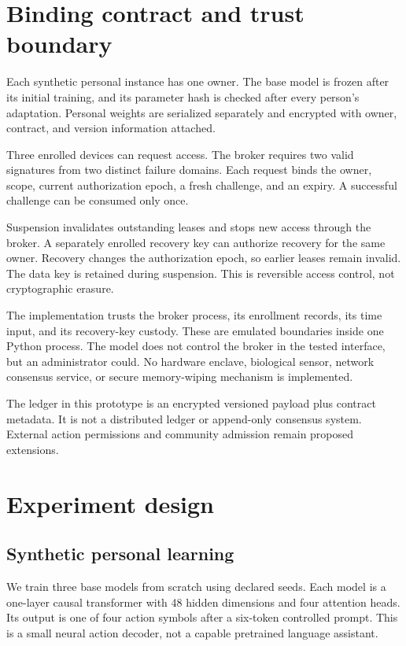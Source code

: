 \documentclass[11pt]{article}
\begin{document}
\section{Binding contract and trust boundary}
Each synthetic personal instance has one owner.
The base model is frozen after its initial training, and its parameter hash is checked after every person's adaptation.
Personal weights are serialized separately and encrypted with owner, contract, and version information attached.

Three enrolled devices can request access.
The broker requires two valid signatures from two distinct failure domains.
Each request binds the owner, scope, current authorization epoch, a fresh challenge, and an expiry.
A successful challenge can be consumed only once.

Suspension invalidates outstanding leases and stops new access through the broker.
A separately enrolled recovery key can authorize recovery for the same owner.
Recovery changes the authorization epoch, so earlier leases remain invalid.
The data key is retained during suspension.
This is reversible access control, not cryptographic erasure.

The implementation trusts the broker process, its enrollment records, its time input, and its recovery-key custody.
These are emulated boundaries inside one Python process.
The model does not control the broker in the tested interface, but an administrator could.
No hardware enclave, biological sensor, network consensus service, or secure memory-wiping mechanism is implemented.

The ledger in this prototype is an encrypted versioned payload plus contract metadata.
It is not a distributed ledger or append-only consensus system.
External action permissions and community admission remain proposed extensions.

\section{Experiment design}
\subsection{Synthetic personal learning}
We train three base models from scratch using declared seeds.
Each model is a one-layer causal transformer with 48 hidden dimensions and four attention heads.
Its output is one of four action symbols after a six-token controlled prompt.
This is a small neural action decoder, not a capable pretrained language assistant.
\end{document}
